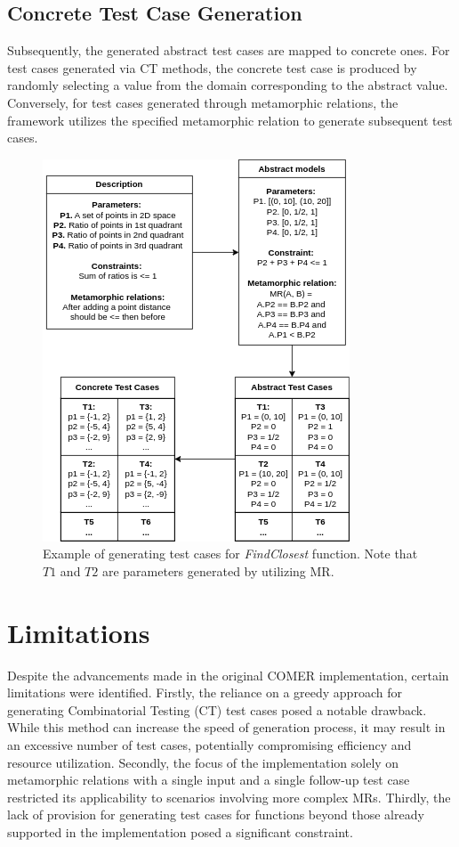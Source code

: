 \subsection{Concrete Test Case Generation}

Subsequently, the generated abstract test cases are mapped to concrete ones. For test cases generated via CT methods, the concrete test case is produced by randomly selecting a value from the domain corresponding to the abstract value. Conversely, for test cases generated through metamorphic relations, the framework utilizes the specified metamorphic relation to generate subsequent test cases.

\begin{figure}[hbt]
\centering
\includegraphics[]{figs/test_cases.png}
\caption{Example of generating test cases for \textit{FindClosest} function. Note that $T1$ and $T2$ are parameters generated by utilizing MR.}
\label{fig:secex}
\end{figure}

\section{Limitations}

Despite the advancements made in the original COMER implementation, certain limitations were identified. Firstly, the reliance on a greedy approach for generating Combinatorial Testing (CT) test cases posed a notable drawback. While this method can increase the speed of generation process, it may result in an excessive number of test cases, potentially compromising efficiency and resource utilization. Secondly, the focus of the implementation solely on metamorphic relations with a single input and a single follow-up test case restricted its applicability to scenarios involving more complex MRs. Thirdly, the lack of provision for generating test cases for functions beyond those already supported in the implementation posed a significant constraint.

